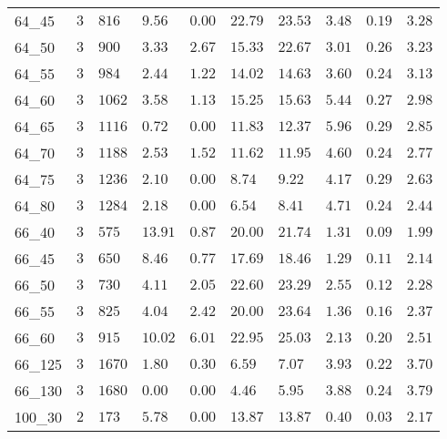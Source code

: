\begin{center}
\begin{table}[]
\begin{tabular}{|lll|l|l|ll|lll|}
\hline
64\_45   & $3$    & $816 $ & $9.56$   & $\bm{0.00}$     & $22.79$      & $23.53$     & $3.48$   & $0.19$     & $3.28$      \\
64\_50   & $3$    & $900 $ & $3.33$   & $2.67$     & $15.33$      & $22.67$     & $3.01$   & $0.26$     & $3.23$      \\
64\_55   & $3$    & $984 $ & $2.44$   & $1.22$     & $14.02$      & $14.63$     & $3.60$   & $0.24$     & $3.13$      \\
64\_60   & $3$    & $1062$ & $3.58$   & $1.13$     & $15.25$      & $15.63$     & $5.44$   & $0.27$     & $2.98$      \\
64\_65   & $3$    & $1116$ & $0.72$   & $\bm{0.00}$     & $11.83$      & $12.37$     & $5.96$   & $0.29$     & $2.85$      \\
64\_70   & $3$    & $1188$ & $2.53$   & $1.52$     & $11.62$      & $11.95$     & $4.60$   & $0.24$     & $2.77$      \\
64\_75   & $3$    & $1236$ & $2.10$   & $\bm{0.00}$     & $8.74 $      & $9.22 $     & $4.17$   & $0.29$     & $2.63$      \\
64\_80   & $3$    & $1284$ & $2.18$   & $\bm{0.00}$     & $6.54 $      & $8.41 $     & $4.71$   & $0.24$     & $2.44$      \\
\hline
66\_40   & $3$    & $575 $ & $13.91$  & $0.87$     & $20.00$      & $21.74$     & $1.31$   & $0.09$     & $1.99$      \\
66\_45   & $3$    & $650 $ & $8.46 $  & $0.77$     & $17.69$      & $18.46$     & $1.29$   & $0.11$     & $2.14$      \\
66\_50   & $3$    & $730 $ & $4.11 $  & $2.05$     & $22.60$      & $23.29$     & $2.55$   & $0.12$     & $2.28$      \\
66\_55   & $3$    & $825 $ & $4.04 $  & $2.42$     & $20.00$      & $23.64$     & $1.36$   & $0.16$     & $2.37$      \\
66\_60   & $3$    & $915 $ & $10.02$  & $6.01$     & $22.95$      & $25.03$     & $2.13$   & $0.20$     & $2.51$      \\
66\_125  & $3$    & $1670$ & $1.80 $  & $0.30$     & $6.59 $      & $7.07 $     & $3.93$   & $0.22$     & $3.70$      \\
66\_130  & $3$    & $1680$ & $\bm{0.00} $  & $\bm{0.00}$     & $4.46 $      & $5.95 $     & $3.88$   & $0.24$     & $3.79$      \\
\hline
100\_30  & $2$    & $173$  & $5.78$   & $\bm{0.00}$     & $13.87$      & $13.87$     & $0.40$   & $0.03$     & $2.17$      \\

\end{tabular}
\end{table}
\end{center}
